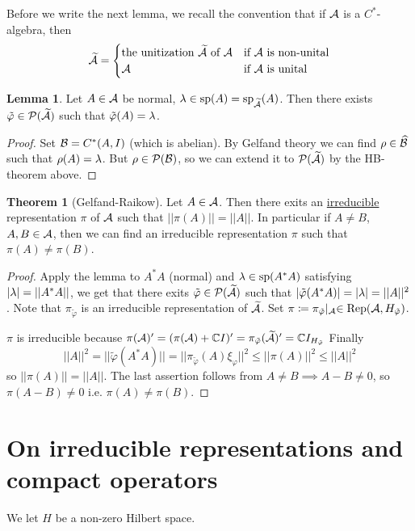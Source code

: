 \documentclass[10pt,english,a4paper]{article}
\theoremstyle{definition}
\newtheorem*{theorem}{Theorem}
\newtheorem*{lemma}{Lemma}
\def\tAs{\widetilde{\As}}
\def\tvphi{\tilde{\varphi}}
\def\xivp{\xi_{\vphi}}
\DeclareMathOperator{\Rep}{Rep}
\DeclareMathOperator{\Sp}{sp}
\def\vphi{\varphi}
\begin{document}
Before we write the next lemma, we recall the convention that if $\mathcal{A}$ is a $C^*$-algebra,
then 
\[\tAs = \begin{cases} \text{the unitization $\tAs$ of $\As$} &\text{if $\As$ is non-unital}\\
\As &\text{if $\As$ is unital} \end{cases} \]
\begin{lemma}
    Let $A \in \mathcal{A}$ be normal, $\la \in \Sp(A) = \Sp_{\tAs}(A)$. 
Then there exists $\tvphi \in \Ps(\tAs)$ such that $\tvphi (A) = \la$.
\end{lemma}
\begin{proof}
    Set $\mathcal{B} = C^*(A,I)$ (which is abelian). By Gelfand theory we can find
$\rho \in \widehat{\mathcal{B}}$ such that $\rho(A)= \lambda$.
But $\rho \in \mathcal{P}(\mathcal{B})$, so we can extend it to $\Ps(\tAs)$ by the HB-theorem above. 
\end{proof}

\begin{theorem}[Gelfand-Raikow]
    Let $A\in \mathcal{A}$. Then there exits an \ul{irreducible} representation 
$\pi$ of $\mathcal{A}$ such that $||\pi(A)|| = ||A||$.
In particular if $A\neq B$, $A,B\in \mathcal{A}$, then we can find an 
irreducible representation $\pi$ such that $\pi(A)\neq \pi(B)$. 
\end{theorem}
\begin{proof}
    Apply the lemma to $A^*A$ (normal) and $\la \in \Sp(A^*A)$
satisfying $|\lambda|= ||A^*A||$, we get that there exits $\tvphi \in \Ps(\tAs)$
such that $|\tvphi(A^*A)| = |\la| = ||A||^2$. Note that $\pi_{\tvphi}$
is an irreducible representation of $\tAs$. Set 
$\pi \coloneqq \pi_{\tvphi}\lvert_{\As} \in \Rep(\As,H_{\tvphi})$.

$\pi$ is irreducible because 
$\pi(\As)' = (\pi(\As) + \C I)' = \pi_{\tvphi}(\tAs)' = \C I_{H_{\tvphi}}$
Finally 
\[ ||A||^2 = ||\tvphi(A^*A)|| = ||\pi_{\tvphi}(A)\xivp||^2 \leq ||\pi(A)||^2 \leq ||A||^2 \]
so $||\pi(A)|| = ||A||$. The last assertion follows from $A\neq B \implies A-B
\neq 0$, so $\pi(A-B)\neq 0$ i.e. $\pi(A)\neq \pi(B)$.

\end{proof}

\section{On irreducible representations and compact operators}

We let $H$ be a non-zero Hilbert space.
\end{document}
